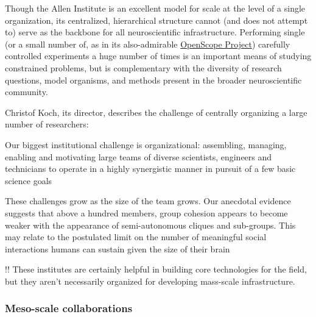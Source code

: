\documentclass[11pt]{article}
\begin{document}
\begin{multicols}{2}
Though the Allen Institute is an excellent model for scale at the level
of a single organization, its centralized, hierarchical structure cannot
(and does not attempt to) serve as the backbone for all neuroscientific
infrastructure. Performing single (or a small number of, as in its
also-admirable
\href{https://alleninstitute.org/what-we-do/brain-science/news-press/articles/three-collaborative-studies-launch-openscope-shared-observatory-neuroscience}{OpenScope
Project}) carefully controlled experiments a huge number of times is an
important means of studying constrained problems, but is complementary
with the diversity of research questions, model organisms, and methods
present in the broader neuroscientific community.

Christof Koch, its director, describes the challenge of centrally
organizing a large number of researchers:

\begin{leftbar}
Our biggest institutional challenge is organizational: assembling,
managing, enabling and motivating large teams of diverse scientists,
engineers and technicians to operate in a highly synergistic manner in
pursuit of a few basic science goals \cite{grillnerWorldwideInitiativesAdvance2016} 
\end{leftbar}

\begin{leftbar}
These challenges grow as the size of the team grows. Our anecdotal
evidence suggests that above a hundred members, group cohesion appears
to become weaker with the appearance of semi-autonomous cliques and
sub-groups. This may relate to the postulated limit on the number of
meaningful social interactions humans can sustain given the size of
their brain \cite{kochBigScienceTeam2016} 
\end{leftbar}

!! These institutes are certainly helpful in building core technologies
for the field, but they aren't necessarily organized for developing
mass-scale infrastructure.

\hypertarget{meso-scale-collaborations}{%
\subsubsection{Meso-scale
collaborations}\label{meso-scale-collaborations}}


\end{multicols}
\end{document}
